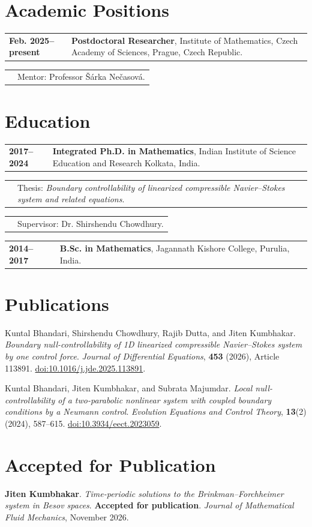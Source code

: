 \documentclass[10pt,a4paper]{article}
\makeatletter
\newcommand{\cvitem}[2]{%
  \begin{tabularx}{\textwidth}{@{}>{\bfseries}p{0.18\textwidth}X@{}}
  #1 & #2
  \end{tabularx}%
}
\newcommand{\publication}[3]{\item #1. \emph{#2}. #3}
\makeatother
\begin{document}
\section*{Academic Positions}
\cvitem{Feb. 2025--present}{\textbf{Postdoctoral Researcher}, Institute of Mathematics, Czech Academy of Sciences, Prague, Czech Republic.}
\cvitem{}{Mentor: Professor \v{S}\'arka Ne\v{c}asov\'a.}

\section*{Education}
\cvitem{2017--2024}{\textbf{Integrated Ph.D. in Mathematics}, Indian Institute of Science Education and Research Kolkata, India.}
\cvitem{}{Thesis: \emph{Boundary controllability of linearized compressible Navier--Stokes system and related equations}.}
\cvitem{}{Supervisor: Dr. Shirshendu Chowdhury.}
\cvitem{2014--2017}{\textbf{B.Sc. in Mathematics}, Jagannath Kishore College, Purulia, India.}

\section*{Publications}
\begin{enumerate}[leftmargin=2em,label={\textbf{[P\arabic*]}}]
    \publication{Kuntal Bhandari, Shirshendu Chowdhury, Rajib Dutta, and Jiten Kumbhakar}
    {Boundary null-controllability of 1D linearized compressible Navier--Stokes system by one control force}
    {\emph{Journal of Differential Equations}, \textbf{453} (2026), Article 113891. \href{https://doi.org/10.1016/j.jde.2025.113891}{doi:10.1016/j.jde.2025.113891}.}

    \publication{Kuntal Bhandari, Jiten Kumbhakar, and Subrata Majumdar}
    {Local null-controllability of a two-parabolic nonlinear system with coupled boundary conditions by a Neumann control}
    {\emph{Evolution Equations and Control Theory}, \textbf{13}(2) (2024), 587--615. \href{https://doi.org/10.3934/eect.2023059}{doi:10.3934/eect.2023059}.}
\end{enumerate}

\section*{Accepted for Publication}
\begin{enumerate}[leftmargin=2em,label={\textbf{[A\arabic*]}}]
    \item \textbf{Jiten Kumbhakar}. \emph{Time-periodic solutions to the Brinkman--Forchheimer system in Besov spaces}. \textbf{Accepted for publication}. \emph{Journal of Mathematical Fluid Mechanics}, November 2026.
\end{enumerate}
\end{document}
